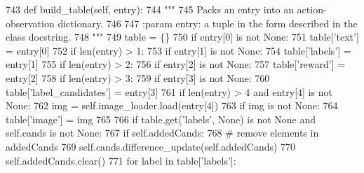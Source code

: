 \begin{DoxyCode}
743     \textcolor{keyword}{def }build\_table(self, entry):
744         \textcolor{stringliteral}{"""}
745 \textcolor{stringliteral}{        Packs an entry into an action-observation dictionary.}
746 \textcolor{stringliteral}{}
747 \textcolor{stringliteral}{        :param entry: a tuple in the form described in the class docstring.}
748 \textcolor{stringliteral}{        """}
749         table = \{\}
750         \textcolor{keywordflow}{if} entry[0] \textcolor{keywordflow}{is} \textcolor{keywordflow}{not} \textcolor{keywordtype}{None}:
751             table[\textcolor{stringliteral}{'text'}] = entry[0]
752         \textcolor{keywordflow}{if} len(entry) > 1:
753             \textcolor{keywordflow}{if} entry[1] \textcolor{keywordflow}{is} \textcolor{keywordflow}{not} \textcolor{keywordtype}{None}:
754                 table[\textcolor{stringliteral}{'labels'}] = entry[1]
755         \textcolor{keywordflow}{if} len(entry) > 2:
756             \textcolor{keywordflow}{if} entry[2] \textcolor{keywordflow}{is} \textcolor{keywordflow}{not} \textcolor{keywordtype}{None}:
757                 table[\textcolor{stringliteral}{'reward'}] = entry[2]
758         \textcolor{keywordflow}{if} len(entry) > 3:
759             \textcolor{keywordflow}{if} entry[3] \textcolor{keywordflow}{is} \textcolor{keywordflow}{not} \textcolor{keywordtype}{None}:
760                 table[\textcolor{stringliteral}{'label\_candidates'}] = entry[3]
761         \textcolor{keywordflow}{if} len(entry) > 4 \textcolor{keywordflow}{and} entry[4] \textcolor{keywordflow}{is} \textcolor{keywordflow}{not} \textcolor{keywordtype}{None}:
762             img = self.image\_loader.load(entry[4])
763             \textcolor{keywordflow}{if} img \textcolor{keywordflow}{is} \textcolor{keywordflow}{not} \textcolor{keywordtype}{None}:
764                 table[\textcolor{stringliteral}{'image'}] = img
765 
766         \textcolor{keywordflow}{if} table.get(\textcolor{stringliteral}{'labels'}, \textcolor{keywordtype}{None}) \textcolor{keywordflow}{is} \textcolor{keywordflow}{not} \textcolor{keywordtype}{None} \textcolor{keywordflow}{and} self.cands \textcolor{keywordflow}{is} \textcolor{keywordflow}{not} \textcolor{keywordtype}{None}:
767             \textcolor{keywordflow}{if} self.addedCands:
768                 \textcolor{comment}{# remove elements in addedCands}
769                 self.cands.difference\_update(self.addedCands)
770                 self.addedCands.clear()
771             \textcolor{keywordflow}{for} label \textcolor{keywordflow}{in} table[\textcolor{stringliteral}{'labels'}]:

\end{DoxyCode}

